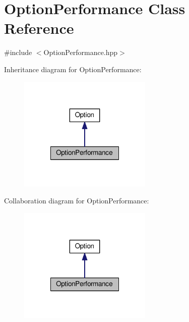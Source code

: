 \hypertarget{classOptionPerformance}{\section{Option\-Performance Class Reference}
\label{classOptionPerformance}
}


{\ttfamily \#include $<$Option\-Performance.\-hpp$>$}



Inheritance diagram for Option\-Performance\-:\nopagebreak
\begin{figure}[H]
\begin{center}
\leavevmode
\includegraphics[width=180pt]{classOptionPerformance__inherit__graph}
\end{center}
\end{figure}


Collaboration diagram for Option\-Performance\-:\nopagebreak
\begin{figure}[H]
\begin{center}
\leavevmode
\includegraphics[width=180pt]{classOptionPerformance__coll__graph}
\end{center}
\end{figure}
